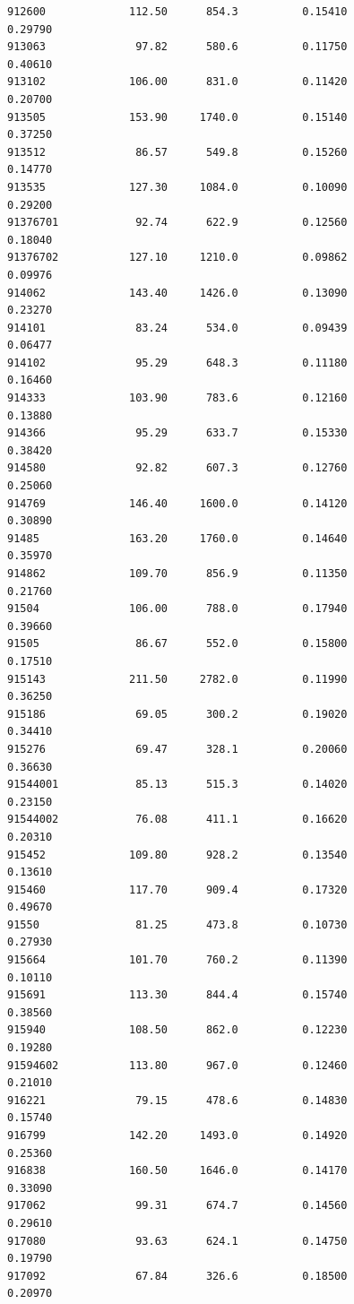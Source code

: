 \documentclass[
  letterpaper,
  DIV=11,
  numbers=noendperiod]{scrartcl}
\begin{document}
\begin{verbatim}
912600             112.50      854.3          0.15410           0.29790
913063              97.82      580.6          0.11750           0.40610
913102             106.00      831.0          0.11420           0.20700
913505             153.90     1740.0          0.15140           0.37250
913512              86.57      549.8          0.15260           0.14770
913535             127.30     1084.0          0.10090           0.29200
91376701            92.74      622.9          0.12560           0.18040
91376702           127.10     1210.0          0.09862           0.09976
914062             143.40     1426.0          0.13090           0.23270
914101              83.24      534.0          0.09439           0.06477
914102              95.29      648.3          0.11180           0.16460
914333             103.90      783.6          0.12160           0.13880
914366              95.29      633.7          0.15330           0.38420
914580              92.82      607.3          0.12760           0.25060
914769             146.40     1600.0          0.14120           0.30890
91485              163.20     1760.0          0.14640           0.35970
914862             109.70      856.9          0.11350           0.21760
91504              106.00      788.0          0.17940           0.39660
91505               86.67      552.0          0.15800           0.17510
915143             211.50     2782.0          0.11990           0.36250
915186              69.05      300.2          0.19020           0.34410
915276              69.47      328.1          0.20060           0.36630
91544001            85.13      515.3          0.14020           0.23150
91544002            76.08      411.1          0.16620           0.20310
915452             109.80      928.2          0.13540           0.13610
915460             117.70      909.4          0.17320           0.49670
91550               81.25      473.8          0.10730           0.27930
915664             101.70      760.2          0.11390           0.10110
915691             113.30      844.4          0.15740           0.38560
915940             108.50      862.0          0.12230           0.19280
91594602           113.80      967.0          0.12460           0.21010
916221              79.15      478.6          0.14830           0.15740
916799             142.20     1493.0          0.14920           0.25360
916838             160.50     1646.0          0.14170           0.33090
917062              99.31      674.7          0.14560           0.29610
917080              93.63      624.1          0.14750           0.19790
917092              67.84      326.6          0.18500           0.20970

\end{verbatim}
\end{document}
